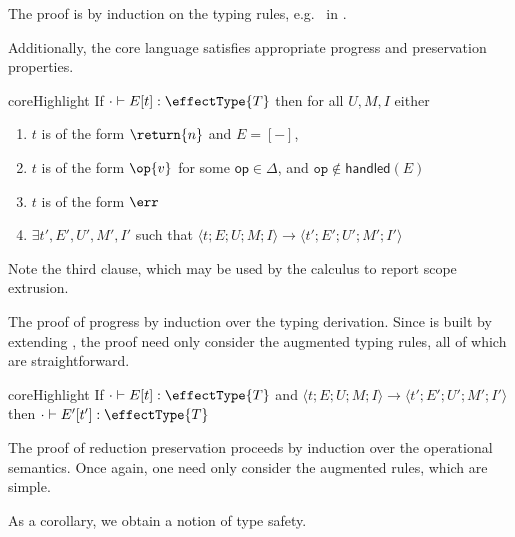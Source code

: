 The proof is by induction on the typing rules, e.g.\  in .  

Additionally, the core language \coreLang{} satisfies appropriate progress and preservation properties. 

\begin{theorem}[Progress]{coreHighlight} 
If $\cdot \vdash {E[t]}: {\effectType{T}}$ then for all $U, M, I$ either 
\begin{enumerate}
\item $t$ is of the form $\return{n}$ and $E = [-]$,
\item $t$ is of the form $\op{v}$ for some $\textsf{op} \in \Delta$, and $\texttt{op} \notin \textsf{handled}(E)$
\item $t$ is of the form $\err$
\item $\exists t', E', U', M', I'$ such that $\langle t; E; U; M; I \rangle \rightarrow \langle t';E';U';M';I'\rangle$
\end{enumerate}
\end{theorem}
Note the third clause, which may be used by the calculus to report scope extrusion. 

The proof of progress by induction over the typing derivation. Since \coreLang{} is built by extending \efflang{}, the proof need only consider the augmented typing rules, all of which are straightforward.

\begin{theorem}{coreHighlight}
If $\cdot \vdash E[t]: \effectType{T}$ and $\langle t; E; U; M; I \rangle \to \langle t'; E'; U'; M'; I' \rangle$ 
then $\cdot \vdash E'[t']: \effectType{T}$ 
\end{theorem}
The proof of reduction preservation proceeds by induction over the operational semantics. Once again, one need only consider the augmented rules, which are simple. 

As a corollary, we obtain a notion of type safety.


